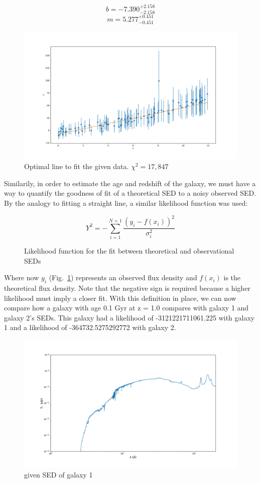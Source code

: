 \documentclass{article}
\begin{document}
$$b = -7.390^{+2.158}_{-2.158}$$
$$m = 5.277^{+0.451}_{-0.451}$$

\begin{figure}[H]
  \centering
\includegraphics[scale=0.3]{data and line}
\caption{Optimal line to fit the given data. $\chi ^2 = 17,847$}
\end{figure}

Similarily, in order to estimate the age and redshift of the galaxy, we must have a way to quantify
the goodness of fit of a theoretical SED to a noisy observed SED. By the analogy to fitting a
straight line, a similar likelihood function was used:


\begin{figure}[H]
\[Y ^2 = - \sum_{i=1}^{N = 1} \frac{(y_i - f(x_i))^2}{\sigma_{i}^2} \]
\caption{Likelihood function for the fit between theoretical and observational SEDs}
\label{fig:14}
\end{figure}

Where now $y_i$ (Fig.~\ref{fig:14}) represents an observed flux density and $f(x_i)$ is the theoretical flux density.
Note that the negative sign is required because a higher likelihood must imply a closer fit. With
this definition in place, we can now compare how a galaxy with age 0.1 Gyr at z = 1.0 compares with
galaxy 1 and galaxy 2's SEDs. This galaxy had a likelihood of -3121221711061.225 with galaxy 1 and a
likelihood of -364732.5275292772 with galaxy 2.

\begin{figure}[H]
  \centering
\includegraphics[scale=0.25]{SED galaxy 1}
\caption{given SED of galaxy 1}
\end{figure}
\end{document}
